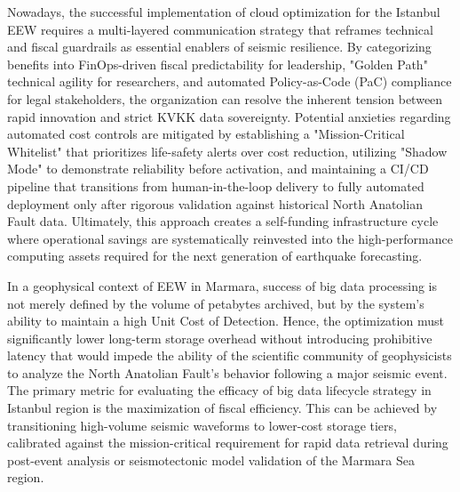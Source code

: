 \documentclass[data,article,submit,pdftex,moreauthors]{Definitions/mdpi}
\begin{document}
Nowadays, the successful implementation of cloud optimization for the Istanbul EEW requires a multi-layered communication strategy that reframes technical and fiscal guardrails as essential enablers of seismic resilience. By categorizing benefits into FinOps-driven fiscal predictability for leadership, "Golden Path" technical agility for researchers, and automated Policy-as-Code (PaC) compliance for legal stakeholders, the organization can resolve the inherent tension between rapid innovation and strict KVKK data sovereignty. Potential anxieties regarding automated cost controls are mitigated by establishing a "Mission-Critical Whitelist" that prioritizes life-safety alerts over cost reduction, utilizing "Shadow Mode" to demonstrate reliability before activation, and maintaining a CI/CD pipeline that transitions from human-in-the-loop delivery to fully automated deployment only after rigorous validation against historical North Anatolian Fault data. Ultimately, this approach creates a self-funding infrastructure cycle where operational savings are systematically reinvested into the high-performance computing assets required for the next generation of earthquake forecasting.

In a geophysical context of EEW in Marmara, success of big data processing is not merely defined by the volume of petabytes archived, but by the system's ability to maintain a high Unit Cost of Detection. Hence, the optimization must significantly lower long-term storage overhead without introducing prohibitive latency that would impede the ability of the scientific community of geophysicists to analyze the North Anatolian Fault’s behavior following a major seismic event. The primary metric for evaluating the efficacy of big data lifecycle strategy in Istanbul region is the maximization of fiscal efficiency. This can be achieved by transitioning high-volume seismic waveforms to lower-cost storage tiers, calibrated against the mission-critical requirement for rapid data retrieval during post-event analysis or seismotectonic model validation of the Marmara Sea region. 



\end{document}
